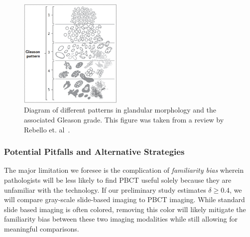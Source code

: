 \documentclass{NIHGrant}
\theoremstyle{theorem}
\begin{document}
\begin{figure}
  \vspace{-0.2cm} \includegraphics[width=0.44\textwidth]{ ./figures/ggrade1.png }
  \caption{Diagram of different patterns in glandular morphology and the associated Gleason grade. This figure was taken from a review by Rebello et. al~\cite{rebello_prostate_2021}.}\label{fig:setup}
\end{figure}

\subsubsection*{Potential Pitfalls and Alternative Strategies}
The major limitation we foresee is the complication of \textit{familiarity bias} wherein pathologists will be less likely to find PBCT useful solely because they are unfamiliar with the technology. If our preliminary study estimates \(\delta\geq 0.4\), we will compare gray-scale slide-based imaging to PBCT imaging. While standard slide based imaging is often colored, removing this color will likely mitigate the familiarity bias between these two imaging modalities while still allowing for meaningful comparisons.
\end{document}
